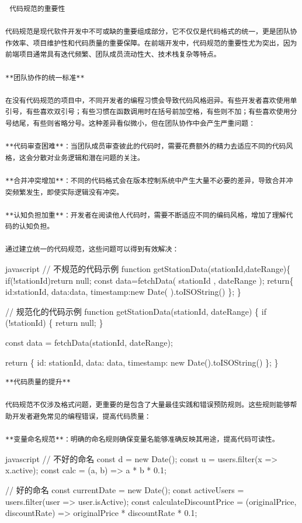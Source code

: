 {{\begin{lstlisting}
 代码规范的重要性

代码规范是现代软件开发中不可或缺的重要组成部分，它不仅仅是代码格式的统一，更是团队协作效率、项目维护性和代码质量的重要保障。在前端开发中，代码规范的重要性尤为突出，因为前端项目通常具有迭代频繁、团队成员流动性大、技术栈复杂等特点。

**团队协作的统一标准**

在没有代码规范的项目中，不同开发者的编程习惯会导致代码风格迥异。有些开发者喜欢使用单引号，有些喜欢双引号；有些习惯在函数调用时在括号前加空格，有些则不加；有些喜欢使用分号结尾，有些则省略分号。这种差异看似微小，但在团队协作中会产生严重问题：

**代码审查困难**：当团队成员审查彼此的代码时，需要花费额外的精力去适应不同的代码风格，这会分散对业务逻辑和潜在问题的关注。

**合并冲突增加**：不同的代码格式会在版本控制系统中产生大量不必要的差异，导致合并冲突频繁发生，即使实际逻辑没有冲突。

**认知负担加重**：开发者在阅读他人代码时，需要不断适应不同的编码风格，增加了理解代码的认知负担。

通过建立统一的代码规范，这些问题可以得到有效解决：
\end{lstlisting}

javascript // 不规范的代码示例 function getStationData(stationId,dateRange)\{ if(!stationId)return null; const data=fetchData( stationId , dateRange ); return\{ id:stationId, data:data, timestamp:new Date( ).toISOString() \}; \}

// 规范化的代码示例 function getStationData(stationId, dateRange) \{ if (!stationId) \{ return null; \}

const data = fetchData(stationId, dateRange);

return \{ id: stationId, data: data, timestamp: new Date().toISOString() \}; \}

\begin{lstlisting}
**代码质量的提升**

代码规范不仅涉及格式问题，更重要的是包含了大量最佳实践和错误预防规则。这些规则能够帮助开发者避免常见的编程错误，提高代码质量：

**变量命名规范**：明确的命名规则确保变量名能够准确反映其用途，提高代码可读性。
\end{lstlisting}

javascript // 不好的命名 const d = new Date(); const u = users.filter(x =\textgreater{} x.active); const calc = (a, b) =\textgreater{} a * b * 0.1;

// 好的命名 const currentDate = new Date(); const activeUsers = users.filter(user =\textgreater{} user.isActive); const calculateDiscountPrice = (originalPrice, discountRate) =\textgreater{} originalPrice * discountRate * 0.1;

}}
